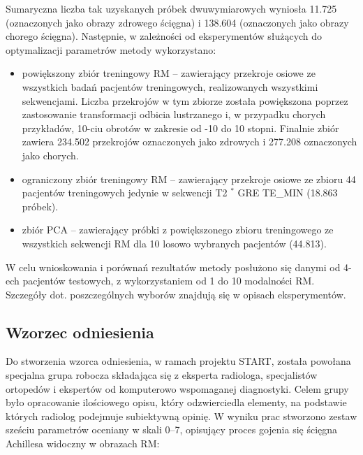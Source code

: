 Sumaryczna liczba tak uzyskanych próbek dwuwymiarowych wyniosła 11.725 (oznaczonych jako obrazy zdrowego ścięgna) i 138.604 (oznaczonych jako obrazy chorego ścięgna). Następnie, w zależności od eksperymentów służących do optymalizacji parametrów metody wykorzystano:
\begin{itemize}
	\item powiększony zbiór treningowy RM -- zawierający przekroje osiowe ze wszystkich badań pacjentów treningowych, realizowanych wszystkimi sekwencjami. Liczba przekrojów w tym zbiorze została powiększona poprzez zastosowanie transformacji odbicia lustrzanego i, w przypadku chorych przykładów, 10-ciu obrotów w zakresie od -10 do 10 stopni. Finalnie zbiór zawiera 234.502 przekrojów oznaczonych jako zdrowych i 277.208 oznaczonych jako chorych.
	\item ograniczony zbiór treningowy RM -- zawierający przekroje osiowe ze zbioru 44 pacjentów treningowych jedynie w sekwencji T2 $^\ast$ GRE TE\_MIN (18.863 próbek).
	\item zbiór PCA -- zawierający próbki z powiększonego zbioru treningowego ze wszystkich sekwencji RM dla 10 losowo wybranych pacjentów (44.813).
\end{itemize}

W celu wnioskowania i porównań rezultatów metody posłużono się danymi od 4-ech pacjentów testowych, z wykorzystaniem od 1 do 10 modalności RM. Szczegóły dot. poszczególnych wyborów znajdują się w opisach eksperymentów.


\subsection{Wzorzec odniesienia}
\label{seq:ground-truth}
Do stworzenia wzorca odniesienia, w ramach projektu START, została powołana specjalna grupa robocza składająca się z eksperta radiologa, specjalistów ortopedów i ekspertów od komputerowo wspomaganej diagnostyki. Celem grupy było opracowanie ilościowego opisu, który odzwierciedla elementy, na podstawie których radiolog podejmuje subiektywną opinię. W wyniku prac stworzono zestaw sześciu parametrów oceniany w skali 0--7, opisujący proces gojenia się ścięgna Achillesa widoczny w obrazach RM:

